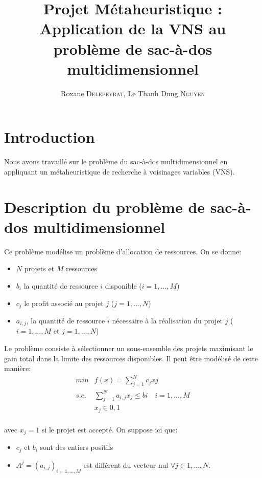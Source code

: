 \documentclass[fleqn]{article}
\title{Projet Métaheuristique : \\Application de la VNS au problème de sac-à-dos multidimensionnel}
\author{Roxane \textsc{Delepeyrat}, Le Thanh Dung \textsc{Nguyen} }
\begin{document}
\maketitle
\renewcommand{\contentsname}{Sommaire}
\tableofcontents
\newpage
\section*{Introduction}
Nous avons travaillé sur le problème du sac-à-dos multidimensionnel en  appliquant un métaheuristique de recherche à voisinages variables (VNS). 
\section{Description du problème de sac-à-dos multidimensionnel}
Ce problème modélise un problème d'allocation de ressources. On se donne:
\begin{itemize}
\item $N$ projets et $M$ ressources
\item $b_{i}$ la quantité de ressource $i$ disponible ($i=1,\ldots,M$)
\item $c_{j}$ le profit associé au projet $j$ ($j=1,\ldots,N$)
\item $a_{i,j}$, la quantité de ressource $i$ nécessaire à la réalisation du projet $j$ ($i=1,\ldots,M$ et $j=1,\ldots,N$)
\end{itemize}
Le problème consiste à sélectionner un sous-ensemble des projets maximisant le gain total dans la limite des ressources disponibles. Il peut être modélisé de cette manière:
\begin{align}
 min &f(x) =\sum_{j=1}^{N}c_{j}x{j}\\
 s.c. & \sum_{j=1}^{N} a_{i,j}x_{j}\leq b{i} \quad i=1,\ldots,M\\
& x_{j}\in {0,1}\\
\end{align}

avec $x_{j}=1$ si le projet est accepté.
On suppose ici que:
\begin{itemize}
\item $c_{j}$ et $b_{i}$ sont des entiers positifs 
\item $A^{j}=(a_{i,j})_{i=1,\ldots,M}$ est différent du vecteur nul $\forall j \in {1,\ldots,N}$.
\end{itemize}
\end{document}
